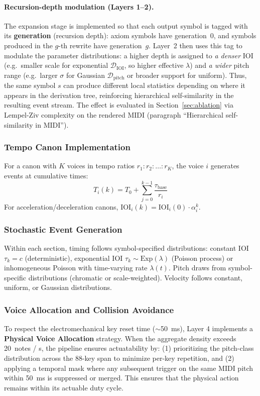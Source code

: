 \documentclass[a4paper]{article}
\theoremstyle{definition}
\theoremstyle{remark}
\begin{document}
\paragraph{Recursion-depth modulation (Layers 1--2).}
The expansion stage is implemented so that each output symbol is tagged with its \textbf{generation} (recursion depth): axiom symbols have generation~0, and symbols produced in the $g$-th rewrite have generation~$g$. Layer~2 then uses this tag to modulate the parameter distributions: a higher depth is assigned to \emph{a denser} IOI (e.g.\ smaller scale for exponential $\mathcal{D}_{\text{IOI}}$, so higher effective $\lambda$) and \emph{a wider} pitch range (e.g.\ larger $\sigma$ for Gaussian $\mathcal{D}_{\text{pitch}}$ or broader support for uniform). Thus, the same symbol $s$ can produce different local statistics depending on where it appears in the derivation tree, reinforcing hierarchical self-similarity in the resulting event stream. The effect is evaluated in Section~\ref{sec:ablation} via Lempel-Ziv complexity on the rendered MIDI (paragraph ``Hierarchical self-similarity in MIDI'').

\subsubsection{Tempo Canon Implementation}

For a canon with $K$ voices in tempo ratios $r_1 : r_2 : \ldots : r_K$, the voice $i$ generates events at cumulative times:
\begin{equation}
    T_i(k) = T_0 + \sum_{j=0}^{k-1} \frac{\tau_{\text{base}}}{r_i}
\label{eq:canon}
\end{equation}
For acceleration/deceleration canons, $\text{IOI}_i(k) = \text{IOI}_i(0) \cdot \alpha_i^k$.

\subsubsection{Stochastic Event Generation}

Within each section, timing follows symbol-specified distributions: constant IOI $\tau_k = c$ (deterministic), exponential IOI $\tau_k \sim \text{Exp}(\lambda)$ (Poisson process) or inhomogeneous Poisson with time-varying rate $\lambda(t)$. Pitch draws from symbol-specific distributions (chromatic or scale-weighted). Velocity follows constant, uniform, or Gaussian distributions.

\subsubsection{Voice Allocation and Collision Avoidance}
To respect the electromechanical key reset time ($\sim$50~ms), Layer 4 implements a \textbf{Physical Voice Allocation} strategy. When the aggregate density exceeds 20~notes / s, the pipeline ensures actuatability by: (1) prioritizing the pitch-class distribution across the 88-key span to minimize per-key repetition, and (2) applying a temporal mask where any subsequent trigger on the same MIDI pitch within 50~ms is suppressed or merged. This ensures that the physical action remains within its actuable duty cycle.
\end{document}
